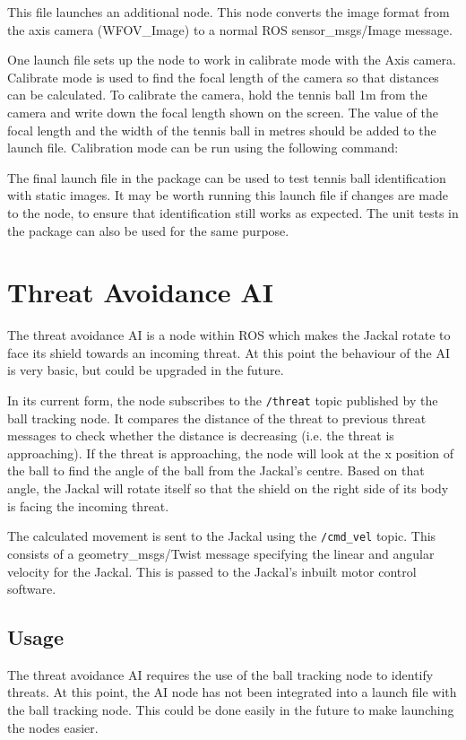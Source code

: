 \documentclass[../main.tex]{subfiles}
\begin{document}
This file launches an additional node. This node converts the image format from the axis camera (WFOV\_Image) to a normal ROS sensor\_msgs/Image message.

One launch file sets up the node to work in calibrate mode with the Axis camera. Calibrate mode is used to find the focal length of the camera so that distances can be calculated. To calibrate the camera, hold the tennis ball 1m from the camera and write down the focal length shown on the screen. The value of the focal length and the width of the tennis ball in metres should be added to the launch file. Calibration mode can be run using the following command:

The final launch file in the package can be used to test tennis ball identification with static images. It may be worth running this launch file if changes are made to the node, to ensure that identification still works as expected. The unit tests in the package can also be used for the same purpose.

\section{Threat Avoidance AI}
The threat avoidance AI is a node within ROS which makes the Jackal rotate to face its shield towards an incoming threat. At this point the behaviour of the AI is very basic, but could be upgraded in the future.

In its current form, the node subscribes to the \texttt{/threat} topic published by the ball tracking node. It compares the distance of the threat to previous threat messages to check whether the distance is decreasing (i.e. the threat is approaching). If the threat is approaching, the node will look at the x position of the ball to find the angle of the ball from the Jackal's centre. Based on that angle, the Jackal will rotate itself so that the shield on the right side of its body is facing the incoming threat.

The calculated movement is sent to the Jackal using the \texttt{/cmd\_vel} topic. This consists of a geometry\_msgs/Twist message specifying the linear and angular velocity for the Jackal. This is passed to the Jackal's inbuilt motor control software. 

\subsection{Usage}
The threat avoidance AI requires the use of the ball tracking node to identify threats. At this point, the AI node has not been integrated into a launch file with the ball tracking node. This could be done easily in the future to make launching the nodes easier.
\end{document}
